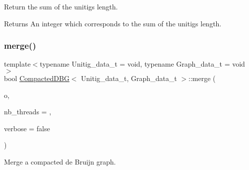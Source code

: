 Return the sum of the unitigs length. 

\begin{DoxyReturn}{Returns}
An integer which corresponds to the sum of the unitigs length. 
\end{DoxyReturn}
\mbox{\label{classCompactedDBG_a936c3dc0ecc4c8aa28fd5b4dedd1746a}} 
\subsubsection{\texorpdfstring{merge()}{merge()}\hspace{0.1cm}{\footnotesize\ttfamily [1/2]}}
{\footnotesize\ttfamily template$<$typename Unitig\+\_\+data\+\_\+t = void, typename Graph\+\_\+data\+\_\+t = void$>$ \\
bool \hyperlink{classCompactedDBG}{Compacted\+D\+BG}$<$ Unitig\+\_\+data\+\_\+t, Graph\+\_\+data\+\_\+t $>$\+::merge (\begin{DoxyParamCaption}\item[{const \hyperlink{classCompactedDBG}{Compacted\+D\+BG}$<$ Unitig\+\_\+data\+\_\+t, Graph\+\_\+data\+\_\+t $>$ \&}]{o,  }\item[{const size\+\_\+t}]{nb\+\_\+threads = {},  }\item[{const bool}]{verbose = {\ttfamily false} }\end{DoxyParamCaption})}



Merge a compacted de Bruijn graph. 

